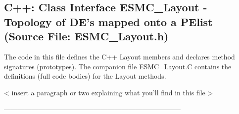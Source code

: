  
\parskip        0pt
\parindent      0pt
\baselineskip  11pt
 
\def\bv{\begin{verbatim}}
\def\ev{\end{verbatim}}
\def\be{\begin{equation}}
\def\ee{\end{equation}}
\def\bea{\begin{eqnarray}}
\def\eea{\end{eqnarray}}
\def\bi{\begin{itemize}}
\def\ei{\end{itemize}}
\def\bn{\begin{enumerate}}
\def\en{\end{enumerate}}
\def\bd{\begin{description}}
\def\ed{\end{description}}
\def\({\left (}
\def\){\right )}
\def\[{\left [}
\def\]{\right ]}
\def\<{\left  \langle}
\def\>{\right \rangle}
\def\cI{{\cal I}}
\def\diag{\mathop{\rm diag}}
\def\tr{\mathop{\rm tr}}


 
\subsection{C++:  Class Interface ESMC\_Layout - Topology of DE's mapped onto a PElist (Source File: ESMC\_Layout.h)}


  
  
   The code in this file defines the C++ Layout members and declares method 
   signatures (prototypes).  The companion file ESMC\_Layout.C contains
   the definitions (full code bodies) for the Layout methods.
  
   < insert a paragraph or two explaining what you'll find in this file >
  
  -----------------------------------------------------------------------------
   
